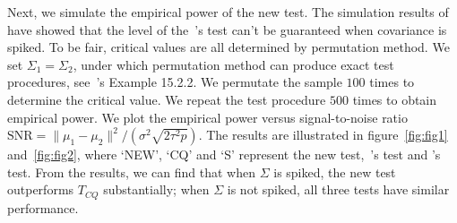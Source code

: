 \documentclass[review]{elsarticle}
\theoremstyle{plain}
\theoremstyle{definition}
\theoremstyle{remark}
\begin{document}





Next, we simulate the empirical power of the new test.
The simulation results of~\cite{Ma2015A} have showed that the level of the~\cite{Chen2010A}'s test can't be guaranteed when covariance is spiked.
To be fair,  critical values are all determined by permutation method.
We set $\Sigma_1=\Sigma_2$, under which permutation method can produce exact test procedures, see~\cite{Lehmann}'s Example 15.2.2.\@
We permutate the sample $100$ times to determine the critical value. We repeat the test procedure $500$ times to obtain empirical power.
We plot the empirical power versus signal-to-noise ratio $\textrm{SNR}=\|\mu_1-\mu_2\|^2/(\sigma^2\sqrt{2\tau^2 p})$.
The results are illustrated in figure~\ref{fig:fig1} and~\ref{fig:fig2}, where `NEW', `CQ' and `S' represent the new test,~\cite{Chen2010A}'s test and \cite{Srivastava2008A}'s test.
From the results, we can find that when $\Sigma$ is spiked, the new test outperforms $T_{CQ}$ substantially; when $\Sigma$ is not spiked, all three tests have similar performance.
\end{document}
